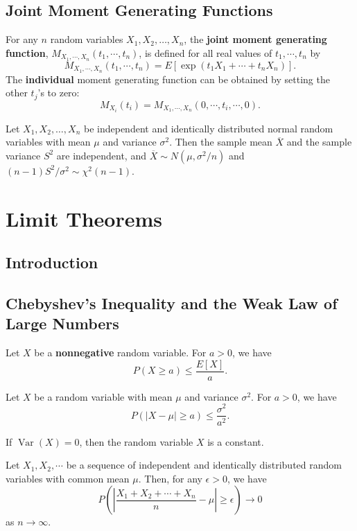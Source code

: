 \subsection{Joint Moment Generating Functions}

For any \(n\) random variables \(X_1, X_2, \ldots, X_n\), the \textbf{joint
moment generating function}, \(M_{X_1, \cdots, X_n}(t_1, \cdots, t_n)\), is
defined for all real values of \(t_1, \cdots, t_n\) by
\[M_{X_1, \cdots, X_n}(t_1, \cdots, t_n) = E\left[\exp({t_1X_1 + \cdots +
t_nX_n})\right].\]
The \textbf{individual} moment generating function can be obtained by
setting the other \(t_j\)'s to zero:
\[M_{X_i}(t_i) = M_{X_1, \cdots, X_n}(0, \cdots, t_i, \cdots, 0).\]

Let \(X_1, X_2, \ldots, X_n\) be independent and identically distributed normal
random variables with mean \(\mu\) and variance \(\sigma^2\). Then the sample
mean \(\overline{X}\) and the sample variance \(S^2\) are independent, and
\(\overline{X}\sim N\left(\mu, \sigma^2/n\right)\) and \((n-1)S^2/\sigma^2
\sim \chi^2(n-1)\).

\section{Limit Theorems}

\subsection{Introduction}

\subsection{Chebyshev's Inequality and the Weak Law of Large Numbers}

 Let \(X\) be a
\textbf{nonnegative} random variable. For \(a > 0\), we have 
\[P(X \geq a)\leq \dfrac{E[X]}{a}.\]

 Let \(X\) be a random variable
with mean \(\mu\) and variance \(\sigma^2\). For \(a > 0\), we have
\[P(|X-\mu| \geq a) \leq \dfrac{\sigma^2}{a^2}.\]

 If \(\operatorname{Var}\left(X\right) = 0\), then the
random variable \(X\) is a constant.

 Let \(X_1, X_2, \cdots\) be
a sequence of independent and identically distributed random variables with
common mean \(\mu\). Then, for any \(\epsilon > 0\), we have
\[P\left(\left|\dfrac{X_1+X_2+\cdots+X_n}{n}-\mu\right|\geq
\epsilon\right)\rightarrow 0\]
as \(n\rightarrow\infty\).

